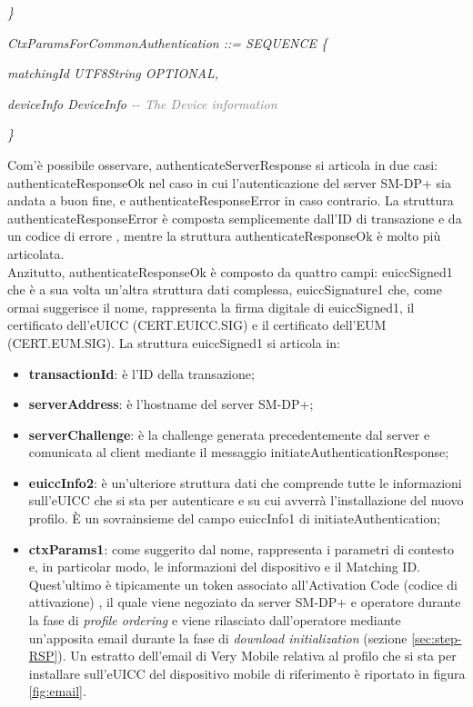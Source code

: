 \documentclass[10pt, oneside]{book}
\begin{document}
\textit{\}\\}

\textit{CtxParamsForCommonAuthentication ::= SEQUENCE \{}

\hspace{0.75cm} \textit{matchingId UTF8String OPTIONAL,}

\hspace{0.75cm} \textit{deviceInfo DeviceInfo \textcolor{gray}{{-}{-} The Device information}}

\textit{\}\\}

Com'è possibile osservare, authenticateServerResponse si articola in due casi: authenticateResponseOk nel caso in cui l'autenticazione del server SM-DP+ sia andata a buon fine, e authenticateResponseError in caso contrario. La struttura authenticateResponseError è composta semplicemente dall'ID di transazione e da un codice di errore \cite{RSP-definitions}, mentre la struttura authenticateResponseOk è molto più articolata.\\
Anzitutto, authenticateResponseOk è composto da quattro campi: euiccSigned1 che è a sua volta un'altra struttura dati complessa, euiccSignature1 che, come ormai suggerisce il nome, rappresenta la firma digitale di euiccSigned1, il certificato dell'eUICC (CERT.EUICC.SIG) e il certificato dell'EUM (CERT.EUM.SIG). La struttura euiccSigned1 si articola in:
\begin{itemize}
\item \textbf{transactionId}: è l'ID della transazione;
\item \textbf{serverAddress}: è l'hostname del server SM-DP+;
\item \textbf{serverChallenge}: è la challenge generata precedentemente dal server e comunicata al client mediante il messaggio initiateAuthenticationResponse;
\item \textbf{euiccInfo2}: è un'ulteriore struttura dati che comprende tutte le informazioni sull'eUICC che si sta per autenticare e su cui avverrà l'installazione del nuovo profilo. È un sovrainsieme del campo euiccInfo1 di initiateAuthentication;
\item \textbf{ctxParams1}: come suggerito dal nome, rappresenta i parametri di contesto e, in particolar modo, le informazioni del dispositivo e il Matching ID. Quest'ultimo è tipicamente un token associato all'Activation Code (codice di attivazione) \cite{RSP-definitions}, il quale viene negoziato da server SM-DP+ e operatore durante la fase di \textit{profile ordering} e viene rilasciato dall'operatore mediante un'apposita email durante la fase di \textit{download initialization} (sezione \ref{sec:step-RSP}). Un estratto dell'email di Very Mobile relativa al profilo che si sta per installare sull'eUICC del dispositivo mobile di riferimento è riportato in figura \ref{fig:email}.
\end{itemize}
\end{document}
